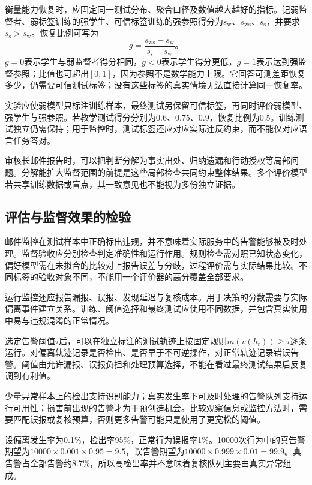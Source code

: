 衡量能力恢复时，应固定同一测试分布、聚合口径及数值越大越好的指标。记弱监督者、弱标签训练的强学生、可信标签训练的强参照得分为$s_{\mathrm w}$、$s_{\mathrm{ws}}$、$s_{\mathrm s}$，并要求$s_{\mathrm s}>s_{\mathrm w}$。恢复比例可写为
\begin{equation}
 g=\frac{s_{\mathrm{ws}}-s_{\mathrm{w}}}
          {s_{\mathrm{s}}-s_{\mathrm{w}}}\text{。}
 \label{eq:alignment-weak-strong-recovery}
\end{equation}
$g=0$表示学生与弱监督者得分相同，$g<0$表示学生得分更低，$g=1$表示达到强监督参照；比值也可超出$[0,1]$，因为参照不是数学能力上限。它回答可测差距恢复多少，仍需要可信测试标签；没有这些标签的真实情境无法直接计算同一恢复率。

实验应使弱模型只标注训练样本，最终测试另保留可信标签，再同时评价弱模型、强学生与强参照。若教学测试得分分别为0.6、0.75、0.9，恢复比例为0.5。训练测试独立仍需保持；用于监控时，测试标签还应对应实际违反约束，而不能仅对应语言任务答对。

审核长邮件报告时，可以把判断分解为事实出处、归纳遗漏和行动授权等局部问题。分解能扩大监督范围的前提是这些局部检查共同约束整体结果。多个评价模型若共享训练数据或盲点，其一致意见也不能视为多份独立证据。

\subsection{评估与监督效果的检验}
\label{sec:alignment-oversight-validation}

邮件监控在测试样本中正确标出违规，并不意味着实际服务中的告警能够被及时处理。监督验收应分别检查判定准确性和运行作用。规则检查需对照已知状态变化，偏好模型需在未拟合的比较对上报告误差与分歧，过程评价需与实际结果比较。不同标签的验收对象不同，不能用一个评价器的高分覆盖全部要求。

运行监控还应报告漏报、误报、发现延迟与复核成本。用于决策的分数需要与实际偏离事件建立关系。训练、阈值选择和最终测试应使用不同数据，并包含真实使用中易与违规混淆的正常情况。

选定告警阈值$\tau$后，可以在独立标注的测试轨迹上按固定规则$m(v(h_t))\geq\tau$逐条运行。对偏离轨迹记录是否检出、是否早于不可逆操作，对正常轨迹记录错误告警。阈值由允许漏报、误报负担和处理预算选择，不能在看过最终测试结果后反复调到有利值。

少量异常样本上的检出支持识别能力；真实发生率下可及时处理的告警队列支持运行可用性；损害前出现的告警才为干预创造机会。比较观察信息或监控方法时，需要匹配误报或复核预算，否则更多告警可能只是使用了更宽松的阈值。

\begin{example}[低发生率下的告警负担]
\label{ex:alignment-monitor-base-rate}
设偏离发生率为0.1\%，检出率95\%，正常行为误报率1\%。10000次行为中的真告警期望为$10000\times0.001\times0.95=9.5$，误告警期望为$10000\times0.999\times0.01=99.9$。真告警占全部告警约8.7\%，所以高检出率并不意味着复核队列主要由真实异常组成。
\end{example}

